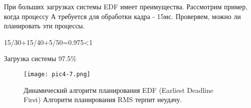 При больших загрузках системы EDF имеет преимущества.
Рассмотрим пример, когда процессу А требуется для обработки кадра - 15мс.
Проверяем, можно ли планировать эти процессы.

15/30+15/40+5/50=0.975<1

Загрузка системы 97.5\%

\begin{figure}[!h]\center
   \texttt{[image: pic4-7.png]}
   \caption{Динамический алгоритм планирования EDF (Earliest Deadline First)
      Алгоритм планирования RMS терпит неудачу.}
\end{figure}


